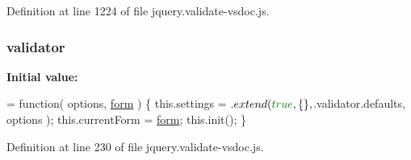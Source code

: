 Definition at line 1224 of file jquery.\+validate-\/vsdoc.\+js.

\hypertarget{jquery_8validate-vsdoc_8js_a2dc8272bb221cdffcccbd20db038f172}{}
\subsubsection[{validator}]{\setlength{\rightskip}{0pt plus 5cm}validator}\label{jquery_8validate-vsdoc_8js_a2dc8272bb221cdffcccbd20db038f172}
{\bfseries Initial value\+:}
\begin{DoxyCode}
= \textcolor{keyword}{function}( options, \hyperlink{jquery_8unobtrusive-ajax_8min_8js_aee46ca1cc1ea003c231a9cbd535599d0}{form} ) \{
    this.settings = $.extend( \textcolor{keyword}{true}, \{\}, $.validator.defaults, options );
    this.currentForm = \hyperlink{jquery_8unobtrusive-ajax_8min_8js_aee46ca1cc1ea003c231a9cbd535599d0}{form};
    this.init();
\}
\end{DoxyCode}


Definition at line 230 of file jquery.\+validate-\/vsdoc.\+js.

